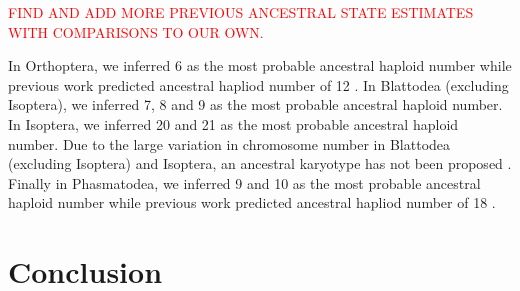 \documentclass[]{rsos}%
\begin{document}
\textcolor{red}{FIND AND ADD MORE PREVIOUS ANCESTRAL STATE ESTIMATES WITH COMPARISONS TO OUR OWN.}

In Orthoptera, we inferred 6 as the most probable ancestral haploid number while previous work predicted ancestral hapliod number of 12 \cite{white1973}.
In Blattodea (excluding Isoptera), we inferred 7, 8 and 9 as the most probable ancestral haploid number. In Isoptera, we inferred 20 and 21 as the most probable ancestral haploid number. Due to the large variation in chromosome number in Blattodea (excluding Isoptera) and Isoptera, an ancestral karyotype has not been proposed \cite{white1976, bergamaschi2007karyology}. 
Finally in Phasmatodea, we inferred 9 and 10 as the most probable ancestral haploid number while previous work predicted ancestral hapliod number of 18 \cite{hughes1959}.

\section{Conclusion}
\end{document}
